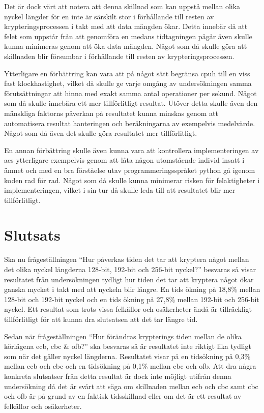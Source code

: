 Det är dock värt att notera att denna skillnad som kan uppstå mellan olika nyckel längder för en inte är särskilt stor i förhållande till resten av krypteringsprocessen
i takt med att data mängden ökar. Detta innebär då att felet som uppstår från att genomföra en medans tidtagningen pågår även skulle kunna minimeras genom att
öka data mängden. Något som då skulle göra att skillnaden blir försumbar i förhållande till resten av krypteringsprocessen.%

Ytterligare en förbättring kan vara att på något sätt begränsa \gls{cpuh} till en viss fast klockhastighet, vilket då skulle ge varje omgång av undersökningen samma förutsättningar
att hinna med exakt samma antal operationer per sekund. Något som då skulle innebära ett mer tillförlitligt resultat. Utöver detta skulle även den mänskliga faktorns påverkan på resultatet kunna minskas
genom att automatisera resultat hanteringen och beräkningarna av exempelvis medelvärde. Något som då även det skulle göra resultatet mer tillförlitligt. %

En annan förbättring skulle även kunna vara att kontrollera implementeringen av \acrshort{aes} ytterligare exempelvis genom att låta någon utomstående individ insatt i ämnet och
med en bra förståelse utav programmeringsspråket \gls{python} gå igenom koden rad för rad. Något som då skulle kunna minimerar risken för felaktigheter i implementeringen,
vilket i sin tur då skulle leda till att resultatet blir mer tillförlitligt. %

\section{Slutsats} %
\label{sec:conclusion}
Ska nu frågeställningen “Hur påverkas tiden det tar att kryptera något mellan det olika nyckel längderna 128-bit, 192-bit och 256-bit nyckel?” besvaras så visar resultatet från
undersökningen tydligt hur tiden det tar att kryptera något ökar ganska mycket i takt med att nyckeln blir längre. En tids ökning på 18,8\% mellan 128-bit och 192-bit nyckel och en tids ökning på 27,8\%
mellan 192-bit och 256-bit nyckel. Ett resultat som trots vissa felkällor och osäkerheter ändå är tillräckligt tillförlitligt för att kunna dra slutsatsen att det tar längre tid.

Sedan när frågeställningen “Hur förändras krypterings tiden mellan de olika körlägena \acrshort{ecb}, \acrshort{cbc} \& \acrshort{ofb}?” ska besvaras så är resultatet inte
riktigt lika tydligt som när det gäller nyckel längderna. Resultatet visar på en tidsökning på 0,3\% mellan \acrshort{ecb} och \acrshort{cbc} och en tidsökning på 0,1\% mellan \acrshort{cbc} och
\acrshort{ofb}. Att dra några konkreta slutsatser från detta resultat är dock inte möjligt utifrån denna undersökning då det är svårt att säga om skillnaden mellan \acrshort{ecb} och \acrshort{cbc} samt
\acrshort{cbc} och \acrshort{ofb} är på grund av en faktisk tidsskillnad eller om det är ett resultat av felkällor och osäkerheter.


